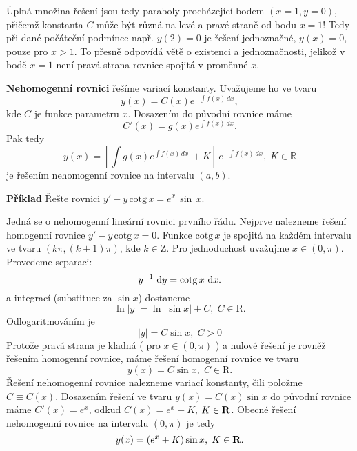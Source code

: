    Úplná množina řešení jsou tedy paraboly procházející bodem $(x=1,y=0)$, přičemž konstanta $C$ může být
   různá na levé a pravé straně od bodu $x=1$! Tedy při dané počáteční podmínce např. $y(2) = 0$ je řešení
   jednoznačné, $y(x)=0$, pouze pro $x>1$. To přesně odpovídá větě o existenci a jednoznačnosti, jelikož v bodě
   $x=1$ není pravá strana rovnice spojitá v proměnné $x$.

   {\bf Nehomogenní rovnici} řešíme variací konstanty. Uvažujeme ho ve tvaru
   \[
      y(x) = C(x)e^{-\int f(x)\,dx},
   \]
   kde $C$ je funkce parametru $x$.
   Dosazením do původní rovnice máme
   \[
      C'(x) = g(x)e^{\int f(x)\,dx}.
   \]
   Pak tedy
   \[
      y(x)=\left[\int g(x)e^{\int f(x)\,dx}\,+K\right]\,e^{-\int f(x)\,dx}, \;K\in\mathbb{R}
   \]
   je řešením nehomogenní rovnice na intervalu $(a,b)$.

   {\bf Příklad}
   Řešte rovnici $y'-y\,\mathrm{cotg}\,x=e^x\,\sin\,x$.
   
   Jedná se o nehomogenní lineární rovnici prvního řádu.
   Nejprve nalezneme řešení homogenní rovnice $y'-y\,\mathrm{cotg}\,x=0$.
   Funkce $\mathrm{cotg}\,x$ je spojitá na každém intervalu ve tvaru
   $(k\pi,(k+1)\pi)$, kde $k\in\mathrm{Z}$.
   Pro jednoduchost uvažujme $x\in(0,\pi)$.
   Provedeme separaci:
   \[
        y^{-1}\,\,{\rm d} y=\operatorname{cotg} x\,\,{\rm d} x.
   \]
   a integrací (substituce za $\sin x$) dostaneme
   \[
      \ln |y| = \ln |\sin x|+C, \; C\in\mathrm{R}.
   \]
   Odlogaritmováním je
   \[
      |y| = C\sin x, \; C>0
   \]
   Protože pravá strana je kladná ( pro $x\in(0,\pi)$ ) a nulové řešení je rovněž řešením homogenní rovnice,
   máme řešení homogenní rovnice ve tvaru
   \[
      y(x) = C\sin x,\; C\in\mathrm{R}.
   \]
   Řešení nehomogenní rovnice nalezneme variací konstanty, čili položme $C\equiv C(x)$.
   Dosazením řešení ve tvaru $y(x)=C(x)\sin x$ do původní rovnice máme $C'(x) = e^x$,
   odkud $C(x) = e^x+K$, $K\in{\rm\bf R}$.
   Obecné řešení nehomogenní rovnice na intervalu $(0,\pi)$ je tedy
   \[
      y(x) = (e^x+K)\sin x, \; K\in{\rm\bf R}.
   \]

